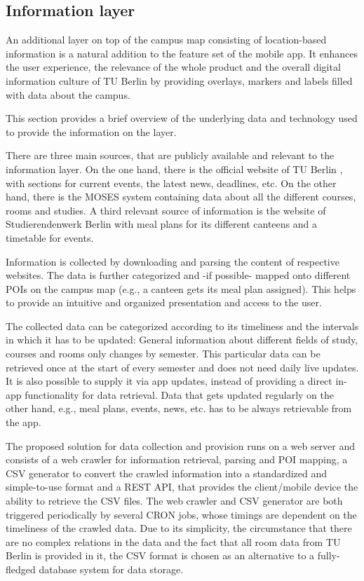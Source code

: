 \subsection{Information layer}
An additional layer on top of the campus map consisting of location-based information is a natural addition to the feature set of the mobile app. It enhances the user experience, the relevance of the whole product and the overall digital information culture of TU Berlin by providing overlays, markers and labels filled with data about the campus.

This section provides a brief overview of the underlying data and technology used to provide the information on the layer.

There are three main sources, that are publicly available and relevant to the information layer. On the one hand, there is the official website of TU Berlin \cite{tu_berlin_main}, with sections for current events, the latest news, deadlines, etc. On the other hand, there is the MOSES system \cite{tu_berlin_moses} containing data about all the different courses, rooms and studies. A third relevant source of information is the website of Studierendenwerk Berlin \cite{studierendenwerk_berlin} with meal plans for its different canteens and a timetable for events.

Information is collected by downloading and parsing the content of respective websites. The data is further categorized and -if possible- mapped onto different POIs on the campus map (e.g., a canteen gets its meal plan assigned). This helps to provide an intuitive and organized presentation and access to the user.

The collected data can be categorized according to its timeliness and the intervals in which it has to be updated: General information about different fields of study, courses and rooms only changes by semester. This particular data can be retrieved once at the start of every semester and does not need daily live updates. It is also possible to supply it via app updates, instead of providing a direct in-app functionality for data retrieval. Data that gets updated regularly on the other hand, e.g., meal plans, events, news, etc. has to be always retrievable from the app.

The proposed solution for data collection and provision runs on a web server and consists of a web crawler for information retrieval, parsing and POI mapping, a CSV generator to convert the crawled information into a standardized and simple-to-use format and a REST API, that provides the client/mobile device the ability to retrieve the CSV files. The web crawler and CSV generator are both triggered periodically by several CRON jobs, whose timings are dependent on the timeliness of the crawled data. Due to its simplicity, the circumstance that there are no complex relations in the data and the fact that all room data from TU Berlin is provided in it, the CSV format is chosen as an alternative to a fully-fledged database system for data storage.

